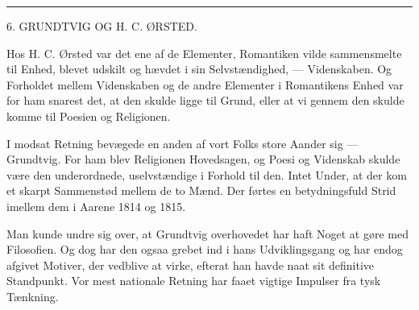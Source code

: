 \documentclass[12pt,a4paper,openany]{book}
\newcommand{\opage}[1]{\marginnote{\footnotesize\textit{[#1]}}}
\begin{document}
\begin{center}\rule{2cm}{0.4pt}\end{center}

\setcounter{footnote}{0}%
\opage{57}

\begin{center}\large 6. GRUNDTVIG OG H. C. ØRSTED.\end{center}

Hos H. C. Ørsted var det ene af de Elementer, Romantiken vilde sammensmelte til
Enhed, blevet udskilt og hævdet i sin Selvstændighed, --- Videnskaben. Og
Forholdet mellem Videnskaben og de andre Elementer i Romantikens Enhed var for
ham snarest det, at den skulde ligge til Grund, eller at vi gennem den skulde
komme til Poesien og Religionen.

I modsat Retning bevægede en anden af vort Folks store Aander sig ---
Grundtvig. For ham blev Religionen Hovedsagen, og Poesi og Videnskab skulde
være den underordnede, uselvstændige i Forhold til den. Intet Under, at der kom
et skarpt Sammenstød mellem de to Mænd. Der førtes en betydningsfuld Strid
imellem dem i Aarene 1814 og 1815.

Man kunde undre sig over, at Grundtvig overhovedet har haft Noget at gøre med
Filosofien. Og dog har den ogsaa grebet ind i hans Udviklingsgang og har endog
afgivet Motiver, der vedblive at virke, efterat han havde naat sit definitive
Standpunkt. Vor mest nationale Retning har faaet vigtige Impulser fra tysk Tænkning.
\end{document}
